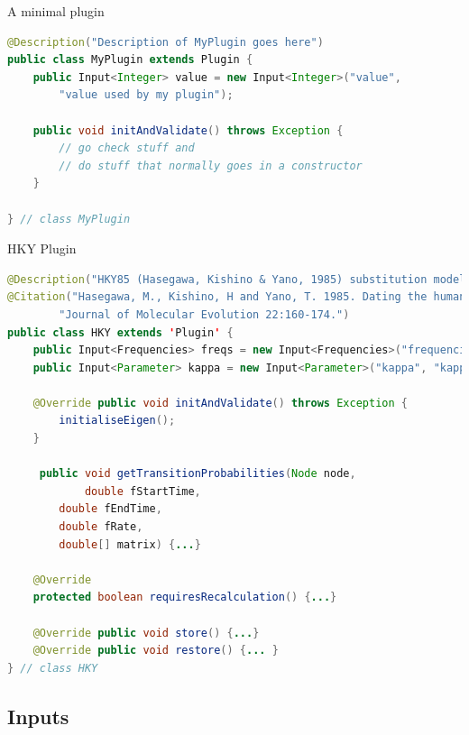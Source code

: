 \documentclass{beamer}
\theoremstyle{definition}
\begin{document}
\begin{frame}[containsverbatim]
{A minimal plugin}

{\color{blue}\begin{lstlisting}[language=java]
@Description("Description of MyPlugin goes here")
public class MyPlugin extends Plugin {
    public Input<Integer> value = new Input<Integer>("value",
        "value used by my plugin");

    public void initAndValidate() throws Exception {
        // go check stuff and 
        // do stuff that normally goes in a constructor
    }

} // class MyPlugin
\end{lstlisting}}
\end{frame}


\begin{frame}[containsverbatim]
{HKY Plugin}

{
\tiny
\begin{lstlisting}[language=java]
@Description("HKY85 (Hasegawa, Kishino & Yano, 1985) substitution model of nucleotide evolution.")
@Citation("Hasegawa, M., Kishino, H and Yano, T. 1985. Dating the human-ape splitting by a molecular clock of mitochondrial DNA. " +
        "Journal of Molecular Evolution 22:160-174.")
public class HKY extends 'Plugin' {
    public Input<Frequencies> freqs = new Input<Frequencies>("frequencies", "frequencies nucleotide letters");
    public Input<Parameter> kappa = new Input<Parameter>("kappa", "kappa parameter in HKY model", Validate.REQUIRED);

    @Override public void initAndValidate() throws Exception {
        initialiseEigen();        
    }

     public void getTransitionProbabilities(Node node, 
      		double fStartTime, 
		double fEndTime, 
		double fRate, 
		double[] matrix) {...}
 
    @Override
    protected boolean requiresRecalculation() {...}

    @Override public void store() {...}
    @Override public void restore() {... }
} // class HKY
\end{lstlisting}
}
\end{frame}

\subsection{Inputs}
\end{document}
